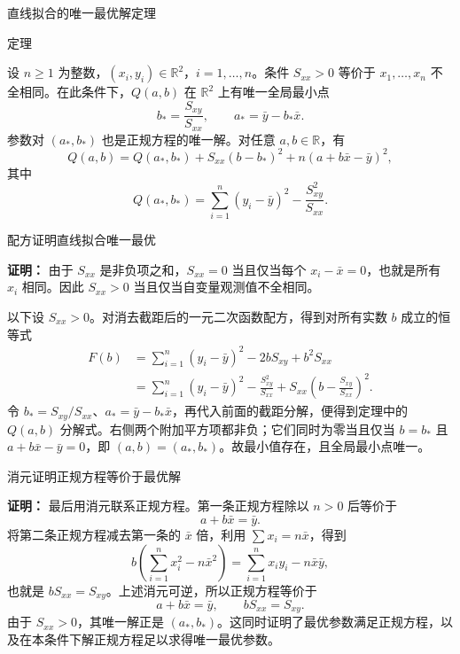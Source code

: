 \documentclass[aspectratio=169,10pt,fontset=fandol]{ctexbeamer}
\begin{document}
\begin{frame}[t,fragile]{直线拟合的唯一最优解定理}
\footnotesize
\begin{block}{定理}
{\footnotesize
设 $n\geq1$ 为整数，$(x_i,y_i)\in\mathbb{R}^2$，$i=1,\ldots,n$。条件 $S_{xx}>0$ 等价于 $x_1,\ldots,x_n$ 不全相同。在此条件下，$Q(a,b)$ 在 $\mathbb{R}^2$ 上有唯一全局最小点
\[
b_* =\frac{S_{xy}}{S_{xx}},\qquad a_* =\bar{y}-b_*\bar{x}.
\]
参数对 $(a_*,b_*)$ 也是正规方程的唯一解。对任意 $a,b\in\mathbb{R}$，有
\[
Q(a,b)=Q(a_*,b_*)+S_{xx}(b-b_*)^2+n(a+b\bar{x}-\bar{y})^2,
\]
其中
\[
Q(a_*,b_*)=\sum_{i=1}^{n}(y_i-\bar{y})^2-\frac{S_{xy}^2}{S_{xx}}.
\]

}
\end{block}
\end{frame}
\begin{frame}[t,fragile]{配方证明直线拟合唯一最优}
\footnotesize
{\footnotesize
\textbf{证明：}
由于 $S_{xx}$ 是非负项之和，$S_{xx}=0$ 当且仅当每个 $x_i-\bar{x}=0$，也就是所有 $x_i$ 相同。因此 $S_{xx}>0$ 当且仅当自变量观测值不全相同。

以下设 $S_{xx}>0$。对消去截距后的一元二次函数配方，得到对所有实数 $b$ 成立的恒等式
\[
\begin{aligned}
F(b)
&=\sum_{i=1}^{n}(y_i-\bar{y})^2-2bS_{xy}+b^2S_{xx}\\
&=\sum_{i=1}^{n}(y_i-\bar{y})^2-\frac{S_{xy}^2}{S_{xx}}
  +S_{xx}\left(b-\frac{S_{xy}}{S_{xx}}\right)^2.
\end{aligned}
\]
令 $b_*=S_{xy}/S_{xx}$、$a_*=\bar{y}-b_*\bar{x}$，再代入前面的截距分解，便得到定理中的 $Q(a,b)$ 分解式。右侧两个附加平方项都非负；它们同时为零当且仅当 $b=b_*$ 且 $a+b\bar{x}-\bar{y}=0$，即 $(a,b)=(a_*,b_*)$。故最小值存在，且全局最小点唯一。


}
\end{frame}
\begin{frame}[t,fragile]{消元证明正规方程等价于最优解}
\footnotesize
{\footnotesize
\textbf{证明：}
最后用消元联系正规方程。第一条正规方程除以 $n>0$ 后等价于
\[
a+b\bar{x}=\bar{y}.
\]
将第二条正规方程减去第一条的 $\bar{x}$ 倍，利用 $\sum x_i=n\bar{x}$，得到
\[
b\left(\sum_{i=1}^{n}x_i^2-n\bar{x}^2\right)
=\sum_{i=1}^{n}x_i y_i-n\bar{x}\bar{y},
\]
也就是 $bS_{xx}=S_{xy}$。上述消元可逆，所以正规方程等价于
\[
a+b\bar{x}=\bar{y},\qquad bS_{xx}=S_{xy}.
\]
由于 $S_{xx}>0$，其唯一解正是 $(a_*,b_*)$。这同时证明了最优参数满足正规方程，以及在本条件下解正规方程足以求得唯一最优参数。

}
\end{frame}
\end{document}
